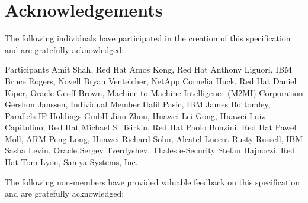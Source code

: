 \chapter{Acknowledgements}\label{chap:Acknowledgements}

The following individuals have participated in the creation of this specification and are gratefully acknowledged:

\begin{oasistitlesection}{Participants}
Amit Shah,	Red Hat	\newline
Amos Kong,	Red Hat	\newline
Anthony Liguori,	IBM	\newline
Bruce Rogers,	Novell	\newline
Bryan Venteicher,	NetApp	\newline
Cornelia Huck,	Red Hat	\newline
Daniel Kiper,	Oracle	\newline
Geoff Brown,	Machine-to-Machine Intelligence (M2MI) Corporation	\newline
Gershon Janssen,	Individual Member	\newline
Halil Pasic,	IBM	\newline
James Bottomley,	Parallels IP Holdings GmbH	\newline
Jian Zhou,	Huawei	\newline
Lei Gong,	Huawei	\newline
Luiz Capitulino,	Red Hat	\newline
Michael S. Tsirkin,	Red Hat	\newline
Paolo Bonzini,	Red Hat	\newline
Pawel Moll,	ARM \newline
Peng Long,	Huawei	\newline
Richard Sohn,	Alcatel-Lucent \newline
Rusty Russell,	IBM	\newline
Sasha Levin,	Oracle	\newline
Sergey Tverdyshev,	Thales e-Security	\newline
Stefan Hajnoczi,	Red Hat	\newline
Tom Lyon,	Samya Systems, Inc.	\newline
\end{oasistitlesection}

The following non-members have provided valuable feedback on this
specification and are gratefully acknowledged:

